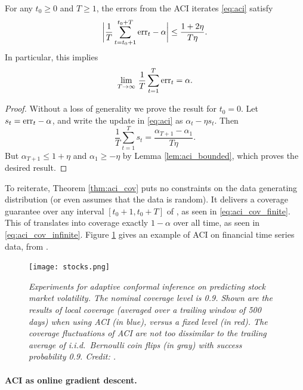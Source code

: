 \documentclass{article}
\begin{document}
\begin{theorem}
\label{thm:aci_cov}
For any $t_0 \geq 0$ and $T \geq 1$, the errors from the ACI iterates
\eqref{eq:aci} satisfy     
\begin{equation}
\label{eq:aci_cov_finite}
\bigg| \frac{1}{T} \sum_{t=t_0+1}^{t_0+T} \text{err}_t - \alpha \bigg| \leq \frac{1 +
  2\eta}{T \eta}. 
\end{equation}
In particular, this implies
\begin{equation}
\label{eq:aci_cov_infinite}
\lim_{T \to \infty} \, \frac{1}{T} \sum_{t=1}^T \text{err}_t = \alpha. 
\end{equation}
\end{theorem}

\begin{proof}
Without a loss of generality we prove the result for $t_0=0$. Let $s_t = \text{err}_t
- \alpha$, and write the update in \eqref{eq:aci} as $\alpha_t - \eta s_t$. Then  
\[
\frac{1}{T} \sum_{t=1}^T s_t = \frac{\alpha_{T+1} - \alpha_1}{T \eta}.  
\]
But $\alpha_{T+1} \leq 1+\eta$ and $\alpha_1 \geq -\eta$ by Lemma
\ref{lem:aci_bounded}, which proves the desired result.
\end{proof}

To reiterate, Theorem \ref{thm:aci_cov} puts no constraints on the data
generating distribution (or even assumes that the data is random). It delivers a
coverage guarantee over any interval $[t_0+1, t_0+T]$ of , as seen in \eqref{eq:aci_cov_finite}. This of
translates into coverage exactly $1-\alpha$ over all time, as seen in
\eqref{eq:aci_cov_infinite}. Figure \ref{fig:stocks} gives an example of ACI on
financial time series data, from \citet{gibbs2021adaptive}.  

\begin{figure}[htb]
\hspace{-30pt}
\texttt{[image: stocks.png]}
\caption{\it Experiments for adaptive conformal inference on predicting stock
  market volatility. The nominal coverage level is 0.9. Shown are the results of
  local coverage (averaged over a trailing window of 500 days) when using ACI
  (in blue), versus a fixed level (in red). The coverage fluctuations of ACI are
  not too dissimilar to the trailing average of i.i.d.\ Bernoulli coin flips (in
  gray) with success probability 0.9. Credit: \citet{gibbs2021adaptive}.}           
\label{fig:stocks}
\end{figure}

\paragraph{ACI as online gradient descent.}
\end{document}
